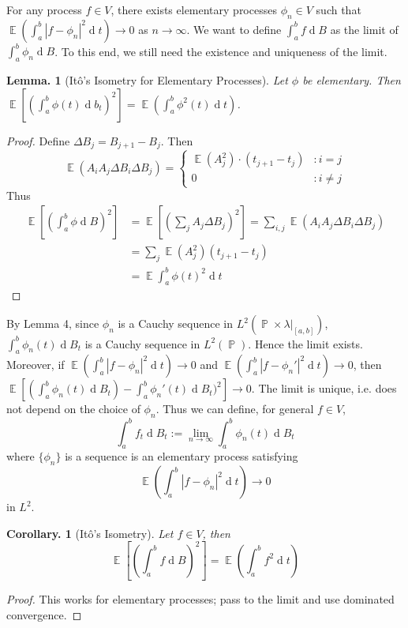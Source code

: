 \documentclass[11pt, a4paper]{memoir}
\theoremstyle{change}
\newtheorem{lemma}[theorem]{Lemma.}
\newtheorem{corollary}[theorem]{Corollary.}
\theoremstyle{plain}
\theoremstyle{nonumberplain}
\newtheorem{proof}{Proof}
\DeclareMathOperator{\pr}{{\mathbb{P}}}
\DeclareMathOperator{\E}{{\mathbb{E}}}
\renewcommand{\d}[1]{\ensuremath{\operatorname{d}\!{#1}}}
\numberwithin{equation}{section}
\begin{document}
For any process $f\in V$, there exists elementary processes $\phi_n\in V$ such that $\E(\int_a^b|f-\phi_n|^2\d{t})\to 0$ as $n\to\infty$.
We want to define $\int_a^b f\d{B}$ as the limit of $\int_a^b\phi_n\d{B}$.
To this end, we still need the existence and uniqueness of the limit.
\begin{lemma}[Itô's Isometry for Elementary Processes]
    Let $\phi$ be elementary.
    Then $\E[(\int_a^b\phi(t)\d{b_t})^2]=\E(\int_a^b\phi^2(t)\d{t})$.
\end{lemma}
\begin{proof}
    Define $\Delta B_j=B_{j+1}-B_j$.
    Then
    \begin{equation*}
        \E(A_iA_j\Delta B_i\Delta B_j) =
        \begin{cases}
            \E(A_j^2)\cdot(t_{j+1}-t_j) &: i=j\\
            0 &: i\neq j
        \end{cases}
    \end{equation*}
    Thus
    \begin{align*}
        \E[(\int_a^b\phi\d{B})^2] &= \E[(\sum_j A_j\Delta B_j)^2] =\sum_{i,j}\E(A_iA_j\Delta B_i\Delta B_j)\\
                                  &= \sum_j\E(A_j^2)(t_{j+1}-t_j)\\
                                  &= \E\int_a^b\phi(t)^2\d{t}
    \end{align*}
\end{proof}
By Lemma 4, since $\phi_n$ is a Cauchy sequence in $L^2(\pr\times\lambda|_{[a,b]})$, $\int_a^b\phi_n(t)\d{B_t}$ is a Cauchy sequence in $L^2(\pr)$.
Hence the limit exists.
Moreover, if $\E(\int_a^b|f-\phi_n|^2\d{t})\to 0$ and $\E(\int_a^b|f-\phi_n'|^2\d{t})\to 0$, then $\E[(\int_a^b\phi_n(t)\d{B_t})-\int_a^b\phi_n'(t)\d{B_t})^2]\to 0$.
The limit is unique, i.e. does not depend on the choice of $\phi_n$.
Thus we can define, for general $f\in V$,
\begin{equation*}
    \int_a^b f_t\d{B_t} := \lim_{n\to\infty}\int_a^b\phi_n(t)\d{B_t}
\end{equation*}
where $\{\phi_n\}$ is a sequence is an elementary process satisfying
\begin{equation*}
    \E(\int_a^b|f-\phi_n|^2\d{t})\to 0
\end{equation*}
in $L^2$.
\begin{corollary}[Itô's Isometry]
    Let $f\in V$, then
    \begin{equation*}
        \E[(\int_a^b f\d{B})^2]=\E(\int_a^b f^2\d{t})
    \end{equation*}
\end{corollary}
\begin{proof}
    This works for elementary processes; pass to the limit and use dominated convergence.
\end{proof}
\end{document}
